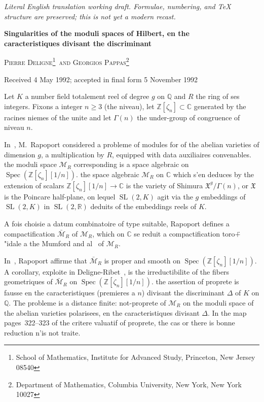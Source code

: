 \documentclass[11pt,a4paper]{article}
\theoremstyle{plain}
\theoremstyle{definition}
\DeclareMathOperator{\Spec}{Spec}
\DeclareMathOperator{\SL}{SL}
\begin{document}
\begin{center}\small\emph{Literal English translation working draft. Formulae, numbering, and TeX structure are preserved; this is not yet a modern recast.}\end{center}
\vspace{0.5em}


\begin{center}
{\Large\bfseries Singularities of the moduli spaces of Hilbert, en the\\[0.3em]
caracteristiques divisant the discriminant}\par
\bigskip
{\scshape Pierre Deligne\footnote{School of Mathematics, Institute for Advanced Study,
Princeton, New Jersey 08540}\ and Georgios Pappas\footnote{Department of Mathematics,
Columbia University, New York, New York 10027}}\par
\smallskip
Received 4 May 1992; accepted in final form 5 November 1992
\end{center}

\thispagestyle{empty}
\setcounter{footnote}{0}

\bigskip

Let $K$ a number field totalement reel of degree $g$ on $\mathbb{Q}$ and $R$
the ring of ses integers. Fixons a integer $n\geq 3$ (the niveau), let
$\mathbb{Z}[\zeta_n]\subset\mathbb{C}$ generated by the racines niemes of the unite and let
$\Gamma(n)$ the under-group of congruence of niveau $n$.

In~\cite{Rapoport}, M.~Rapoport considered a probleme of modules for
of the abelian varieties of dimension $g$, a multiplication by $R$, equipped with
data auxiliaires convenables. the moduli space $\mathscr{M}_R$ corresponding
is a space algebraic on $\Spec(\mathbb{Z}[\zeta_n][1/n])$. the space algebraic
$\mathscr{M}_R$ on $\mathbb{C}$ which s'en deduces by the extension of scalars
$\mathbb{Z}[\zeta_n][1/n]\to\mathbb{C}$ is the variety of Shimura $\mathfrak{X}^g/\Gamma(n)$,
or $\mathfrak{X}$ is the Poincare half-plane, on lequel $\SL(2,K)$ agit via
the $g$ embeddings of $\SL(2,K)$ in $\SL(2,\mathbb{R})$ deduits of the embeddings
reels of $K$.

A fois choisie a datum combinatoire of type suitable, Rapoport
defines a compactification $\bar{\mathscr{M}}_R$ of $\mathscr{M}_R$, which on $\mathbb{C}$ se
reduit a compactification toro\"  + "{i}dale a the Mumford and al~\cite{AMRT} of $\mathscr{M}_R$.

In~\cite{Rapoport}, Rapoport affirme that $\bar{\mathscr{M}}_R$ is proper and smooth
on $\Spec(\mathbb{Z}[\zeta_n][1/n])$. A corollary, exploite in
Deligne-Ribet~\cite{DeligneRibet}, is the irreductibilite of the fibers geometriques
of $\bar{\mathscr{M}}_R$ on $\Spec(\mathbb{Z}[\zeta_n][1/n])$. the assertion of proprete is
fausse en the caracteristiques (premieres a $n$) divisant the discriminant $\Delta$ of $K$
on $\mathbb{Q}$. The probleme is a distance finite: not-proprete of $\mathscr{M}_R$ on the moduli space of the abelian varieties polarisees, en the caracteristiques divisant $\Delta$.
In the map~\cite{Rapoport} pages~322--323 of the critere valuatif of proprete, the cas
or there is bonne reduction n'is not traite.
\end{document}
